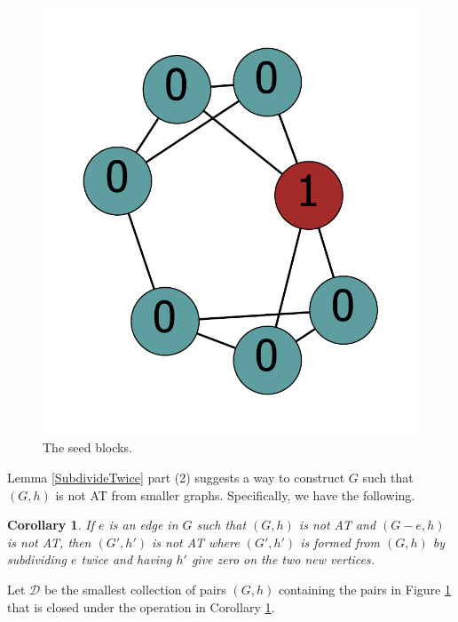 \documentclass[12pt]{article}
\theoremstyle{plain}
\newtheorem{cor}[thm]{Corollary}
\theoremstyle{definition}
\theoremstyle{remark}
\newcommand{\fancy}[1]{\mathcal{#1}}
\newcommand{\D}{\fancy{D}}
\def\D{\fancy{D}}
\begin{document}
\begin{figure}[!htb]
	\includegraphics[scale=0.35]{pictures/010110010110101011010[0,0,0,0,0,0,1].pdf}
	\caption{The seed blocks.}
	\label{fig:seeds}
\end{figure}

Lemma \ref{SubdivideTwice} part (2) suggests a way to construct $G$ such that $(G,h)$ is not AT from smaller graphs.  Specifically, we have the following.
\begin{cor}\label{SubdivideConstructor}
	If $e$ is an edge in $G$ such that $(G,h)$ is not AT and $(G-e, h)$ is not AT, then $(G',h')$ is not AT where $(G',h')$ is formed from $(G,h)$ by subdividing $e$ twice and having $h'$ give zero on the two new vertices.
\end{cor}

Let $\D$ be the smallest collection of pairs $(G,h)$ containing the pairs in Figure \ref{fig:seeds} that is closed under the operation in Corollary \ref{SubdivideConstructor}.
\end{document}
